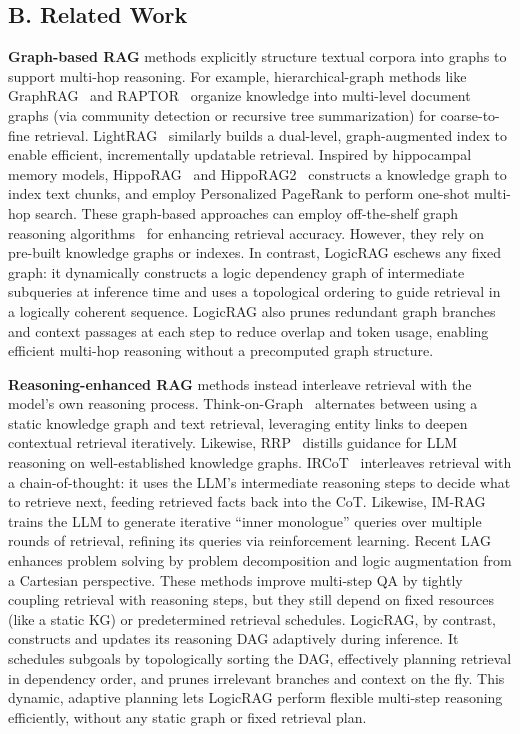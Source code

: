 \subsection{B. Related Work}

\textbf{Graph-based RAG} methods explicitly structure textual corpora into graphs to support multi-hop reasoning. For example, hierarchical-graph methods like GraphRAG~\cite{edge2024local} and RAPTOR~\cite{sarthi2024raptor} organize knowledge into multi-level document graphs (via community detection or recursive tree summarization) for coarse-to-fine retrieval. LightRAG~\cite{guo2024lightrag} similarly builds a dual-level, graph-augmented index to enable efficient, incrementally updatable retrieval. Inspired by hippocampal memory models, HippoRAG~\cite{HippoRAG} and HippoRAG2~\cite{hipporag2} constructs a knowledge graph to index text chunks, and employ Personalized PageRank to perform one-shot multi-hop search. These graph-based approaches can employ off-the-shelf graph reasoning algorithms~\cite{difflogic, neusymea, zhou2025taming, liu2023rsc, bei2023non, chen2024graphcrosscorelated,li2023gslb} for enhancing retrieval accuracy. However, they rely on pre-built knowledge graphs or indexes. In contrast, LogicRAG eschews any fixed graph: it dynamically constructs a logic dependency graph of intermediate subqueries at inference time and uses a topological ordering to guide retrieval in a logically coherent sequence. LogicRAG also prunes redundant graph branches and context passages at each step to reduce overlap and token usage, enabling efficient multi-hop reasoning without a precomputed graph structure.

\textbf{Reasoning-enhanced RAG} methods instead interleave retrieval with the model’s own reasoning process. Think-on-Graph~\cite{ma2024think-on-graph-2.0} alternates between using a static knowledge graph and text retrieval, leveraging entity links to deepen contextual retrieval iteratively. Likewise, RRP~\cite{xiao2025reliablereasoningpathdistilling} distills guidance for LLM reasoning on well-established knowledge graphs. IRCoT~\cite{IRCOT} interleaves retrieval with a chain-of-thought: it uses the LLM’s intermediate reasoning steps to decide what to retrieve next, feeding retrieved facts back into the CoT. Likewise, IM-RAG~\cite{im-rag} trains the LLM to generate iterative ``inner monologue'' queries over multiple rounds of retrieval, refining its queries via reinforcement learning. Recent LAG~\cite{xiao2025laglogicaugmentedgenerationcartesian} enhances problem solving by problem decomposition and logic augmentation from a Cartesian perspective. These methods improve multi-step QA by tightly coupling retrieval with reasoning steps, but they still depend on fixed resources (like a static KG) or predetermined retrieval schedules. LogicRAG, by contrast, constructs and updates its reasoning DAG adaptively during inference. It schedules subgoals by topologically sorting the DAG, effectively planning retrieval in dependency order, and prunes irrelevant branches and context on the fly. This dynamic, adaptive planning lets LogicRAG perform flexible multi-step reasoning efficiently, without any static graph or fixed retrieval plan.



